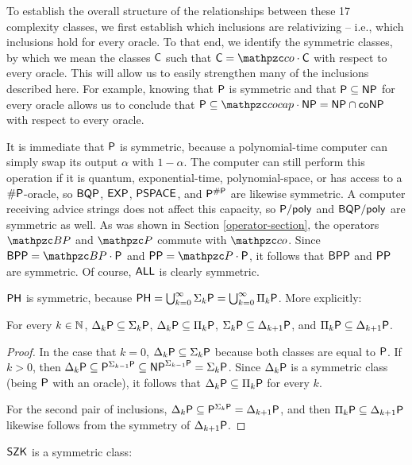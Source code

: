 To establish the overall structure of the relationships between these 17
complexity classes, we first establish which inclusions are relativizing --
i.e., which inclusions hold for every oracle. To that end, we identify the
symmetric classes, by which we mean the classes $\mathsf{C}$ such that
$\sC=\cco\cdot\sC$ with respect to every oracle. This will allow us to easily
strengthen many of the inclusions described here. For example, knowing that
$\mathsf{P}$ is symmetric and that $\mathsf{P}\subseteq\mathsf{NP}$ for every oracle allows us to
conclude that $\sP\subseteq\cocap\cdot\NP=\NP\cap\co\NP$ with respect to every
oracle.

It is immediate that $\mathsf{P}$ is symmetric, because a polynomial-time computer can
simply swap its output $\alpha$ with $1-\alpha$. The computer can still perform
this operation if it is quantum, exponential-time, polynomial-space, or has
access to a $\#\mathsf{P}$-oracle, so $\mathsf{BQP}$, $\mathsf{EXP}$, $\mathsf{PSPACE}$, and
$\mathsf{P}^{\#\mathsf{P}}$ are likewise symmetric. A computer receiving advice strings does
not affect this capacity, so $\mathsf{P}/\mathsf{poly}$ and $\mathsf{BQP}/\mathsf{poly}$ are symmetric as
well. As was shown in Section \ref{operator-section}, the operators $\cBP$
and $\cP$ commute with $\cco$. Since $\msf{BPP}=\cBP\cdot\sP$ and
$\msf{PP}=\cP\cdot\sP$, it follows that $\mathsf{BPP}$ and $\mathsf{PP}$ are
symmetric. Of course, $\mathsf{ALL}$ is clearly symmetric.

$\mathsf{PH}$ is symmetric, because $\mathsf{PH}=\bigcup_{k=0}^\infty\Sigma_k\mathsf{P}=\bigcup_{k=0}^\infty\Pi_k\mathsf{P}$. More explicitly:
\begin{lemma}
For every $k\in\mathbb{N}$, $\Delta_k\mathsf{P}\subseteq\Sigma_k\mathsf{P}$,
$\Delta_k\mathsf{P}\subseteq\Pi_k\mathsf{P}$, $\Sigma_k\mathsf{P}\subseteq\Delta_{k+1}\mathsf{P}$, and
$\Pi_k\mathsf{P}\subseteq\Delta_{k+1}\mathsf{P}$.
\end{lemma}

\begin{proof}
In the case that $k=0$, $\Delta_k\mathsf{P}\subseteq\Sigma_k\mathsf{P}$ because both classes
are equal to $\mathsf{P}$. If $k>0$, then
$\Delta_k\mathsf{P}\subseteq\mathsf{P}^{\Sigma_{k-1}\mathsf{P}}\subseteq\mathsf{NP}^{\Sigma_{k-1}\mathsf{P}}=\Sigma_k\mathsf{P}$.
Since $\Delta_k\mathsf{P}$ is a symmetric class (being $\mathsf{P}$ with an oracle), it
follows that $\Delta_k\mathsf{P}\subseteq\Pi_k\mathsf{P}$ for every $k$.

For the second pair of inclusions,
$\Delta_k\mathsf{P}\subseteq\mathsf{P}^{\Sigma_k\mathsf{P}}=\Delta_{k+1}\mathsf{P}$, and then
$\Pi_k\mathsf{P}\subseteq\Delta_{k+1}\mathsf{P}$ likewise follows from the symmetry of
$\Delta_{k+1}\mathsf{P}$.
\end{proof}

$\mathsf{SZK}$ is a symmetric class:

